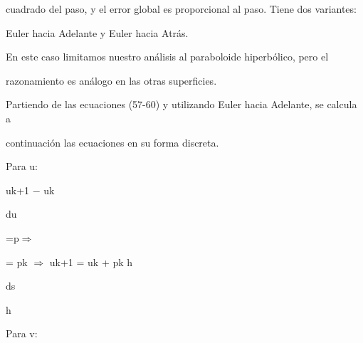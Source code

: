 \documentclass[a4paper,portrait,12pt]{article}
\begin{document}
\begin{flushleft}
cuadrado del paso, y el error global es proporcional al paso. Tiene dos variantes:
\end{flushleft}





\begin{flushleft}
\newpage
Euler hacia Adelante y Euler hacia Atrás.
\end{flushleft}


\begin{flushleft}
En este caso limitamos nuestro análisis al paraboloide hiperbólico, pero el
\end{flushleft}


\begin{flushleft}
razonamiento es análogo en las otras superficies.
\end{flushleft}


\begin{flushleft}
Partiendo de las ecuaciones (57-60) y utilizando Euler hacia Adelante, se calcula a
\end{flushleft}


\begin{flushleft}
continuación las ecuaciones en su forma discreta.
\end{flushleft}


\begin{flushleft}
Para u:
\end{flushleft}


\begin{flushleft}
uk+1 $-$ uk
\end{flushleft}


\begin{flushleft}
du
\end{flushleft}


\begin{flushleft}
=p$\Rightarrow$
\end{flushleft}


\begin{flushleft}
= pk $\Rightarrow$ uk+1 = uk + pk h
\end{flushleft}


\begin{flushleft}
ds
\end{flushleft}


\begin{flushleft}
h
\end{flushleft}


\begin{flushleft}
Para v:
\end{flushleft}
\end{document}
